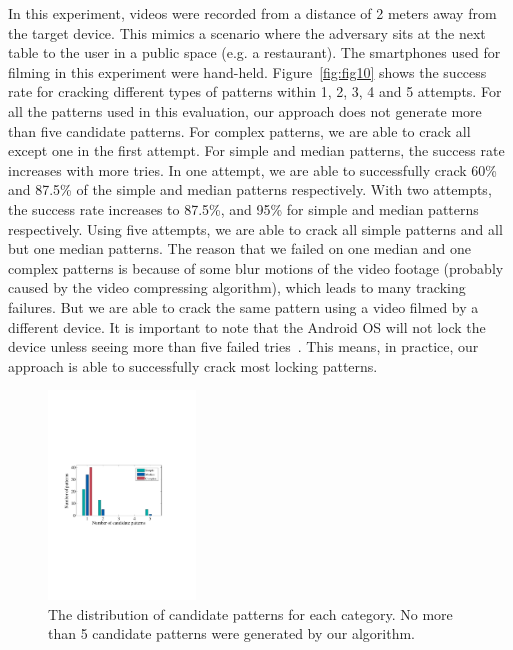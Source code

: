         In this experiment, videos were recorded from a distance of 2 meters away
        from the target device. This mimics a scenario where the adversary sits
        at the next table to the user in a public space (e.g. a restaurant).
        The smartphones used for filming in this experiment were hand-held.
        Figure~\ref{fig:fig10}
        shows the success rate for cracking different types of patterns within 1, 2, 3, 4 and 5 attempts.     For all the patterns used in this evaluation,
        our approach does not generate more than  five candidate patterns.
        For complex patterns, we are able to crack all except one in the first attempt.
        For simple and median patterns, the success rate increases with more tries.
        In one attempt, we are able to
        successfully crack 60\% and 87.5\% of the simple and median patterns respectively. With two attempts, the success rate increases to 87.5\%,
        and 95\% for simple and median patterns
        respectively. Using five attempts, we are able to
        crack all simple patterns and all but one median patterns.
       The reason that we failed on one median and one complex patterns is because of some blur motions of the video footage (probably
       caused by the video compressing algorithm), which leads
       to many tracking failures. But we are able to crack the same
       pattern using a video filmed by a different device.
        It is important to note that the Android OS will not lock the device unless seeing
        more than five failed tries~\cite{egelman2014you}. This means, in practice, our approach is able to
        successfully crack most locking patterns.

\begin{figure}[!t]
    \centering
    \includegraphics[width=0.35\textwidth]{fig/11.pdf}
    \vspace{-3mm}
    \caption{The distribution of candidate patterns for each category. No more than 5 candidate patterns were generated by our algorithm. }
    \label{fig:fig11}
    \vspace{-2mm}
\end{figure}

